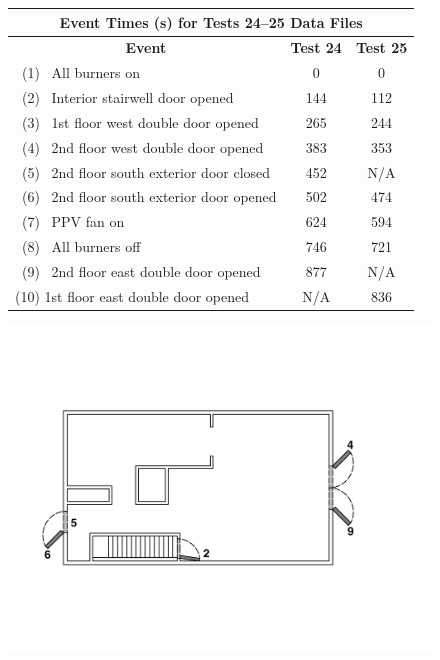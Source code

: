 \documentclass[12pt,oneside]{book}
\begin{document}
\begin{figure}[!ht]
\begin{minipage}[b]{0.8\columnwidth}
	\begin{flushleft}
	\begin{tabular}{lcc}
	\multicolumn{3}{c}{Event Times (s) for Tests 24--25 Data Files} \\
	\toprule
	\multicolumn{1}{c}{\textbf{Event}} 			& \textbf{Test 24}	& \textbf{Test 25} \\
	\midrule
	~(1)~ All burners on 						&   0		  		&	 0			\\
	~(2)~ Interior stairwell door opened 		&   144		  		&    112		\\
	~(3)~ 1st floor west double door opened 	&	265		  		&    244 	 	\\
	~(4)~ 2nd floor west double door opened 	&   383			  	&    353		\\
	~(5)~ 2nd floor south exterior door closed	&   452			  	&    N/A		\\
	~(6)~ 2nd floor south exterior door opened	&   502			  	&    474		\\
	~(7)~ PPV fan on 							&   624			  	&    594 		\\
	~(8)~ All burners off 						&   746 		  	&    721		\\
	~(9)~ 2nd floor east double door opened 	&   877			  	&    N/A		\\
	(10)  1st floor east double door opened		& 	N/A 			& 	 836		\\
	\bottomrule
	\end{tabular}
	\end{flushleft}
\end{minipage}
\begin{minipage}[b]{0.9\columnwidth}
	\vspace{15pt}
	\centering
	\includegraphics[width=\columnwidth]{../Figures/Floor_Plans/West_Structure_2nd_Floor_Test_24}

\end{minipage}
\end{figure}
\end{document}
